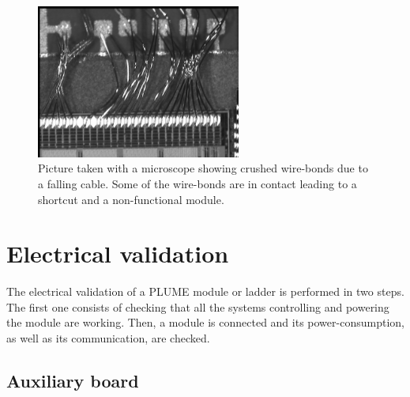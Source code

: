   \begin{figure}[!tbh]
    \centering
    \includegraphics[width=0.6\textwidth]{Pictures/labTests/crash_bonds.jpg}
    \caption{Picture taken with a microscope showing crushed wire-bonds due to a falling cable. Some of the wire-bonds are in contact leading to a shortcut and a non-functional module.}
    \label{fig:wireBondsCrashed}
  \end{figure}

\section{Electrical validation}

  The electrical validation of a \gls{PLUME} module or ladder is performed in two steps.
  The first one consists of checking that all the systems controlling and powering the module are working. 
  Then, a module is connected and its power-consumption, as well as its communication, are checked.

  \subsection{Auxiliary board}

